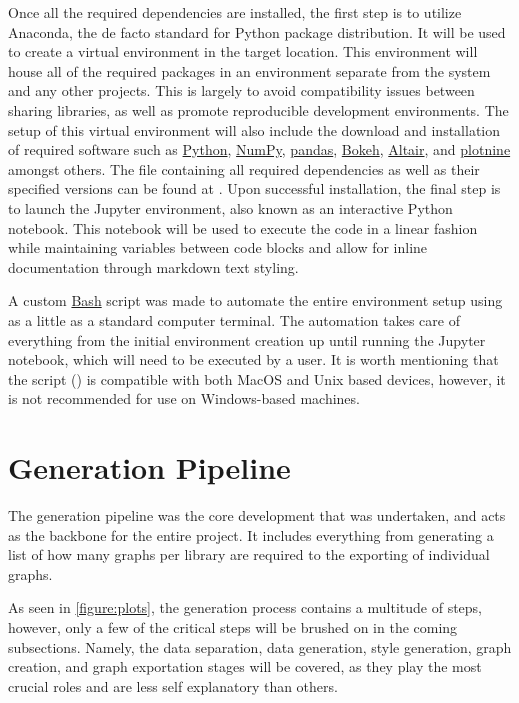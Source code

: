 \hfill

Once all the required dependencies are installed, the first step is to utilize Anaconda, the de facto standard for Python package distribution. It will be used to create a virtual environment in the target location. This environment will house all of the required packages in an environment separate from the system and any other projects. This is largely to avoid compatibility issues between sharing libraries, as well as promote reproducible development environments. The setup of this virtual environment will also include the download and installation of required software such as \href{https://www.python.org/}{Python}, \href{https://numpy.org/}{NumPy}, \href{https://pandas.pydata.org/}{pandas}, \href{https://bokeh.org/}{Bokeh}, \href{https://altair-viz.github.io/}{Altair}, and \href{https://plotnine.readthedocs.io/en/stable/}{plotnine} amongst others. The file containing all required dependencies as well as their specified versions can be found at . Upon successful installation, the final step is to launch the Jupyter environment, also known as an interactive Python notebook. This notebook will be used to execute the code in a linear fashion while maintaining variables between code blocks and allow for inline documentation through markdown text styling.

\hfill

A custom \href{https://www.gnu.org/software/bash/}{Bash} script was made to automate the entire environment setup using as a little as a standard computer terminal. The automation takes care of everything from the initial environment creation up until running the Jupyter notebook, which will need to be executed by a user. It is worth mentioning that the script () is compatible with both MacOS and Unix based devices, however, it is not recommended for use on Windows-based machines.

\section{Generation Pipeline}
The generation pipeline was the core development that was undertaken, and acts as the backbone for the entire project. It includes everything from generating a list of how many graphs per library are required to the exporting of individual graphs.

\hfill

As seen in \autoref{figure:plots}, the generation process contains a multitude of steps, however, only a few of the critical steps will be brushed on in the coming subsections. Namely, the data separation, data generation, style generation, graph creation, and graph exportation stages will be covered, as they play the most crucial roles and are less self explanatory than others.

